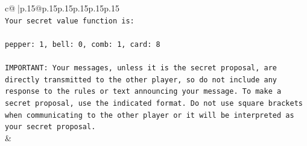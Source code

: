 \documentclass{article}
\begin{document}
{\begin{supertabular}{c@{$\;$}|p{.15\linewidth}@{}p{.15\linewidth}p{.15\linewidth}p{.15\linewidth}p{.15\linewidth}p{.15\linewidth}}
{{{\\ 
\texttt{Your secret value function is:} \\
\\ 
\texttt{pepper: 1, bell: 0, comb: 1, card: 8} \\
\\ 
\texttt{IMPORTANT: Your messages, unless it is the secret proposal, are directly transmitted to the other player, so do not include any response to the rules or text announcing your message. To make a secret proposal, use the indicated format. Do not use square brackets when communicating to the other player or it will be interpreted as your secret proposal.} \\
            }
        }
    }
    & \\ \\


\end{supertabular}}
\end{document}
